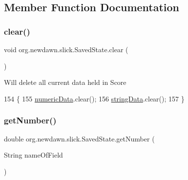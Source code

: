 \subsection{Member Function Documentation}
\mbox{\label{classorg_1_1newdawn_1_1slick_1_1_saved_state_a4784b56dee7616e98dd456b8c92f7212}} 
\subsubsection{\texorpdfstring{clear()}{clear()}}
{\footnotesize\ttfamily void org.\+newdawn.\+slick.\+Saved\+State.\+clear (\begin{DoxyParamCaption}{ }\end{DoxyParamCaption})\hspace{0.3cm}{\ttfamily [inline]}}

Will delete all current data held in Score 
\begin{DoxyCode}
154                         \{
155         \mbox{\hyperlink{classorg_1_1newdawn_1_1slick_1_1_saved_state_ad734be75c78cdbd06ed020c7d416e187}{numericData}}.clear();
156         \mbox{\hyperlink{classorg_1_1newdawn_1_1slick_1_1_saved_state_a5c7e1053721ddfee0b4a2a29facd103b}{stringData}}.clear();
157     \}
\end{DoxyCode}
\mbox{\label{classorg_1_1newdawn_1_1slick_1_1_saved_state_a6daea1aaa6e5d6121457332cb5728af2}} 
\subsubsection{\texorpdfstring{get\+Number()}{getNumber()}\hspace{0.1cm}{\footnotesize\ttfamily [1/2]}}
{\footnotesize\ttfamily double org.\+newdawn.\+slick.\+Saved\+State.\+get\+Number (\begin{DoxyParamCaption}\item[{String}]{name\+Of\+Field }\end{DoxyParamCaption})\hspace{0.3cm}{\ttfamily [inline]}}

